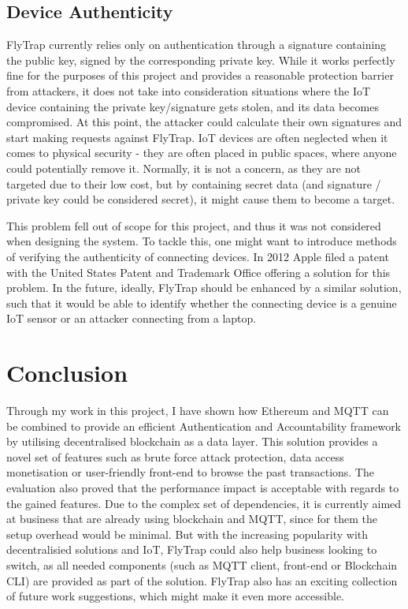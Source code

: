 \subsection{Device Authenticity}
FlyTrap currently relies only on authentication through a signature containing the public key, signed by the corresponding private key. While it works perfectly fine for the purposes of this project and provides a reasonable protection barrier from attackers, it does not take into consideration situations where the IoT device containing the private key/signature gets stolen, and its data becomes compromised. At this point, the attacker could calculate their own signatures and start making requests against FlyTrap. IoT devices are often neglected when it comes to physical security - they are often placed in public spaces, where anyone could potentially remove it. Normally, it is not a concern, as they are not targeted due to their low cost, but by containing secret data (and signature / private key could be considered secret), it might cause them to become a target.

This problem fell out of scope for this project, and thus it was not considered when designing the system. To tackle this, one might want to introduce methods of verifying the authenticity of connecting devices. In 2012 Apple filed a patent with the United States Patent and Trademark Office \cite{omernick2012systems} offering a solution for this problem. In the future, ideally, FlyTrap should be enhanced by a similar solution, such that it would be able to identify whether the connecting device is a genuine IoT sensor or an attacker connecting from a laptop.

\section{Conclusion}
Through my work in this project, I have shown how Ethereum and MQTT can be combined to provide an efficient Authentication and Accountability framework by utilising decentralised blockchain as a data layer. This solution provides a novel set of features such as brute force attack protection, data access monetisation or user-friendly front-end to browse the past transactions. The evaluation also proved that the performance impact is acceptable with regards to the gained features. Due to the complex set of dependencies, it is currently aimed at business that are already using blockchain and MQTT, since for them the setup overhead would be minimal. But with the increasing popularity with decentralisied solutions and IoT, FlyTrap could also help business looking to switch, as all needed components (such as MQTT client, front-end or Blockchain CLI) are provided as part of the solution. FlyTrap also has an exciting collection of future work suggestions, which might make it even more accessible.
